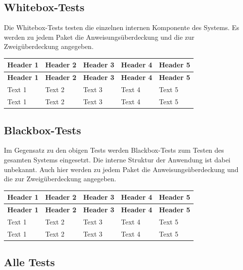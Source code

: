 \documentclass{article}
\begin{document}
\subsection{Whitebox-Tests}

Die Whitebox-Tests testen die einzelnen internen Komponente des Systems. Es werden zu jedem Paket die Anweisungsüberdeckung und die zur Zweigüberdeckung angegeben.

\begin{longtable}{@{}lllll@{}}
\toprule
\textbf{Header 1} & \textbf{Header 2} & \textbf{Header 3} & \textbf{Header 4} & \textbf{Header 5} \\* \midrule
\endfirsthead
\textbf{Header 1} & \textbf{Header 2} & \textbf{Header 3} & \textbf{Header 4} & \textbf{Header 5} \\* \midrule
\endhead
Text 1            & Text 2            & Text 3            & Text 4            & Text 5            \\
Text 1            & Text 2            & Text 3            & Text 4            & Text 5            \\* \bottomrule
\end{longtable}

\subsection{Blackbox-Tests}

Im Gegensatz zu den obigen Tests werden Blackbox-Tests zum Testen des gesamten Systems eingesetzt. Die interne Struktur der Anwendung ist dabei unbekannt. 
Auch hier werden zu jedem Paket die Anweisungsüberdeckung und die zur Zweigüberdeckung angegeben.

\begin{longtable}{@{}lllll@{}}
\toprule
\textbf{Header 1} & \textbf{Header 2} & \textbf{Header 3} & \textbf{Header 4} & \textbf{Header 5} \\* \midrule
\endfirsthead
\textbf{Header 1} & \textbf{Header 2} & \textbf{Header 3} & \textbf{Header 4} & \textbf{Header 5} \\* \midrule
\endhead
Text 1            & Text 2            & Text 3            & Text 4            & Text 5            \\
Text 1            & Text 2            & Text 3            & Text 4            & Text 5            \\* \bottomrule
\end{longtable}

\subsection{Alle Tests}
\end{document}
